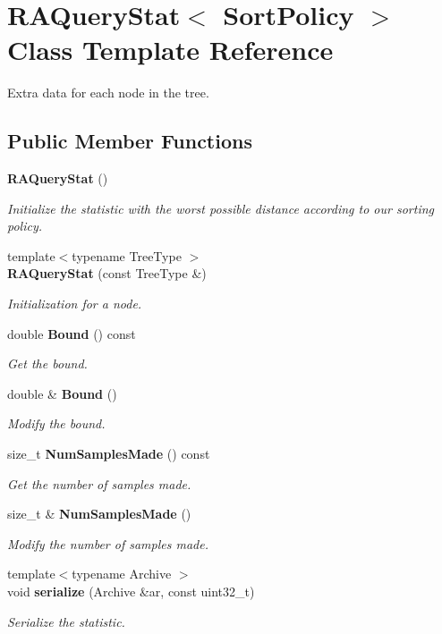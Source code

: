 \section{R\+A\+Query\+Stat$<$ Sort\+Policy $>$ Class Template Reference}
\label{classmlpack_1_1neighbor_1_1RAQueryStat}


Extra data for each node in the tree.  


\subsection*{Public Member Functions}
\begin{DoxyCompactItemize}
\item 
\textbf{ R\+A\+Query\+Stat} ()
\begin{DoxyCompactList}\small\item\em Initialize the statistic with the worst possible distance according to our sorting policy. \end{DoxyCompactList}\item 
{\footnotesize template$<$typename Tree\+Type $>$ }\\\textbf{ R\+A\+Query\+Stat} (const Tree\+Type \&)
\begin{DoxyCompactList}\small\item\em Initialization for a node. \end{DoxyCompactList}\item 
double \textbf{ Bound} () const
\begin{DoxyCompactList}\small\item\em Get the bound. \end{DoxyCompactList}\item 
double \& \textbf{ Bound} ()
\begin{DoxyCompactList}\small\item\em Modify the bound. \end{DoxyCompactList}\item 
size\+\_\+t \textbf{ Num\+Samples\+Made} () const
\begin{DoxyCompactList}\small\item\em Get the number of samples made. \end{DoxyCompactList}\item 
size\+\_\+t \& \textbf{ Num\+Samples\+Made} ()
\begin{DoxyCompactList}\small\item\em Modify the number of samples made. \end{DoxyCompactList}\item 
{\footnotesize template$<$typename Archive $>$ }\\void \textbf{ serialize} (Archive \&ar, const uint32\+\_\+t)
\begin{DoxyCompactList}\small\item\em Serialize the statistic. \end{DoxyCompactList}\end{DoxyCompactItemize}


